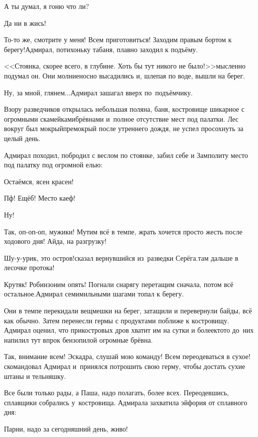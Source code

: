 \diagdash А ты думал, я гоню что ли?

\diagdash Да ни в жись!

\diagdash То-то же, смотрите у меня! Всем приготовиться! Заходим правым бортом к берегу!\mdash Адмирал, потихоньку табаня, плавно заходил к подъёму.

<<Стоянка, скорее всего, в глубине. Хоть бы тут никого не было!>>\mdash мысленно подумал он. Они молниеносно высадились и, шлепая по воде, вышли на берег. 

\diagdash Ну, за мной, глянем$\ldots$\mdash Адмирал зашагал вверх по~подъёмчику.

Взору разведчиков открылась небольшая поляна, баня, костровище шикарное с огромными скамейками\sdash брёвнами и~полное отсутствие мест под палатки. Лес вокруг был мокрый\sdash премокрый после утреннего дождя, не успел просохнуть за целый день.

Адмирал походил, побродил с веслом по стоянке, забил себе и Замполиту место под палатку под огромной елью:

\diagdash Остаёмся, ясен красен!

\diagdash Пф! Ещё\sdash б! Место каеф!

\diagdash Ну!

\diagdash Так, оп-оп-оп, мужики! Мутим всё в темпе, жрать хочется просто жесть после ходового дня! Айда, на разгрузку!

\diagdash Шу-у-урик, это остров!\mdash сказал вернувшийся из~разведки Серёга.\mdash там дальше в лесочке протока!

\diagdash Крутяк! Робинзоним опять! Погнали снарягу перетащим сначала, потом всё остальное.\mdash Адмирал семимильными шагами топал к берегу.

Они в темпе перекидали вещмешки на берег, затащили и перевернули байды, всё как обычно. Затем перенесли гермы с продуктами поближе к костровищу. Адмирал оценил, что прикостровых дров хватит им на сутки и более\mdash кто\sdash то до~них напилил тут впрок бензопилой огромные брёвна.

\diagdash Так, внимание всем! Эскадра, слушай мою команду! Всем переодеваться в сухое!\mdash скомандовал Адмирал и~принялся потрошить свою герму, чтобы достать сухие штаны и тельняшку.

Все были только рады, а Паша, надо полагать, более всех. Переодевшись, сплавщики собрались у~костровища. Адмирала захватила эйфория от сплавного дня:

\diagdash Парни, надо за сегодняшний день, живо! 

